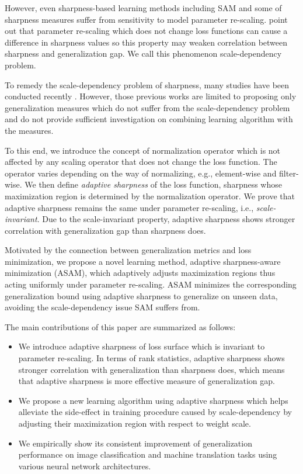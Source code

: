 \documentclass{article}
\begin{document}
However, even sharpness-based learning methods including SAM and some of sharpness measures suffer from sensitivity to model parameter re-scaling. \citet{dinh2017sharp} point out that parameter re-scaling which does not change loss functions can cause a difference in sharpness values so this property may weaken correlation between sharpness and generalization gap. We call this phenomenon scale-dependency problem. 

To remedy the scale-dependency problem of sharpness, many studies have been conducted recently \citep{liang2019fisher, yi2019positively, karakida2019normalization, tsuzuku2020normalized}. However, those previous works are limited to proposing only generalization measures which do not suffer from the scale-dependency problem and do not provide sufficient investigation on combining learning algorithm with the measures. 

To this end, we introduce the concept of normalization operator which is not affected by any scaling operator that does not change the loss function.
The operator varies depending on the way of normalizing, e.g., element-wise and filter-wise.
We then define \textit{adaptive sharpness} of the loss function, sharpness whose maximization region is determined by the normalization operator.
We prove that adaptive sharpness remains the same under parameter re-scaling, i.e., \textit{scale-invariant}.
Due to the scale-invariant property, adaptive sharpness shows stronger correlation with generalization gap than sharpness does.

Motivated by the connection between generalization metrics and loss minimization, we propose a novel learning method, adaptive sharpness-aware minimization (ASAM), which adaptively adjusts maximization regions thus acting uniformly under parameter re-scaling. ASAM minimizes the corresponding generalization bound using adaptive sharpness to generalize on unseen data, avoiding the scale-dependency issue SAM suffers from.

The main contributions of this paper are summarized as follows:

\begin{itemize}
    \item We introduce adaptive sharpness of loss surface which is invariant to parameter re-scaling. 
    In terms of rank statistics, adaptive sharpness shows stronger correlation with generalization than sharpness does, which means that adaptive sharpness is more effective measure of generalization gap.
    \item We propose a new learning algorithm using adaptive sharpness which helps alleviate the side-effect in training procedure caused by scale-dependency by adjusting their maximization region with respect to weight scale. 
    \item We empirically show its consistent improvement of generalization performance on image classification and machine translation tasks using various neural network architectures.
\end{itemize}
\end{document}
